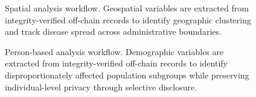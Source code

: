 \begin{figure}[!ht]
\centering
{}
\caption{Spatial analysis workflow. Geospatial variables are extracted from integrity-verified off-chain records to identify geographic clustering and track disease spread across administrative boundaries.}\label{fig:spatial}
\end{figure}

%
%
%


\begin{figure}[!ht]
\centering
{}
\caption{Person-based analysis workflow. Demographic variables are extracted from integrity-verified off-chain records to identify disproportionately affected population subgroups while preserving individual-level privacy through selective disclosure.}\label{fig:person}
\end{figure}

%
%
%


